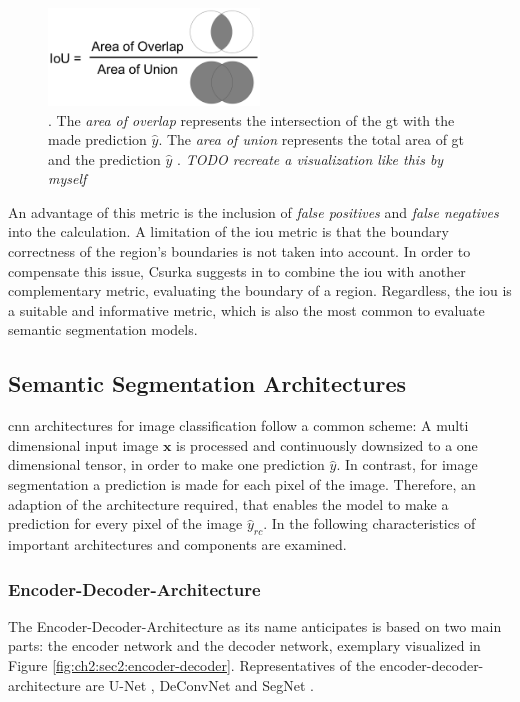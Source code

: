 \begin{figure}
	\centering
	\includegraphics[width=0.5\textwidth]{figures/chap222_iou.png}
	\caption[Intersection over Union]{
		. The \textit{area of overlap} represents the intersection of the \gls{gt} with the made prediction $\hat{y}$. 
		The \textit{area of union} represents the total area of \gls{gt} and the prediction $\hat{y}$ \cite{Sha18-DLCV}. \textit{TODO recreate a visualization like this by myself}}
	\label{fig:ch2:sec2:iou}
\end{figure}

An advantage of this metric is the inclusion of \textit{false positives} and \textit{false negatives} into the calculation.
A limitation of the \gls{iou} metric is that the boundary correctness of the region's boundaries is not taken into account. 
In order to compensate this issue, Csurka suggests in \cite{Csu13-EvalMetric} to combine the \gls{iou} with another complementary metric, evaluating the boundary of a region.
Regardless, the \gls{iou} is a suitable and informative metric, which is also the most common to evaluate semantic segmentation models.



\subsection{Semantic Segmentation Architectures}\label{ord:ch2:sec2:subsec_arch}
\gls{cnn} architectures for image classification follow a common scheme: 
A multi dimensional input image $\textbf{x}$ is processed and continuously downsized to a one dimensional tensor, in order to make one prediction $\hat{y}$.
In contrast, for image segmentation a prediction is made for each pixel of the image.
Therefore, an adaption of the architecture required, that enables the model to make a prediction for every pixel of the image $\hat{y}_{rc}$.
In the following characteristics of important architectures and components are examined.

\subsubsection{Encoder-Decoder-Architecture}
The Encoder-Decoder-Architecture as its name anticipates is based on two main parts: the encoder network and the decoder network, exemplary visualized in Figure \ref{fig:ch2:sec2:encoder-decoder}. 
Representatives of the encoder-decoder-architecture are U-Net \cite{RF15-U-Net}, DeConvNet \cite{NHH15-DeConvNet} and SegNet \cite{Bad17-SegNet}.

